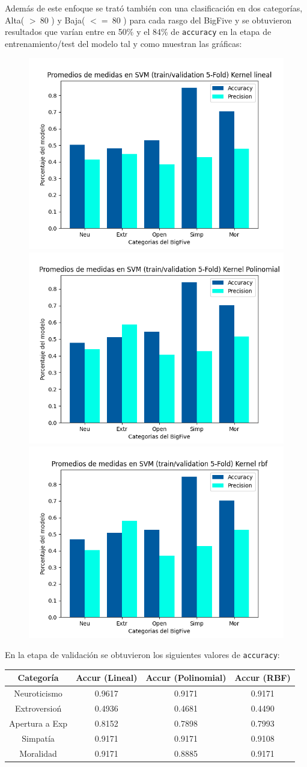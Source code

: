 \documentclass[10pt, a4paper]{article}
\begin{document}
            Adem\'as de este enfoque se trat\'o tambi\'en con una clasificaci\'on en dos categor\'ias, Alta( $>~ 80$ ) y Baja( $<= ~80$ ) para
            cada rasgo del BigFive y se obtuvieron resultados que var\'ian entre en 50\% y el 84\% de \texttt{accuracy} en la etapa 
            de entrenamiento/test del modelo tal y como muestran las gr\'aficas:\\ 

            \begin{figure}[H]
                \centering
                \includegraphics[width = 0.3\linewidth]{Medias_Lineal.png}
                \includegraphics[width = 0.3\linewidth]{Medias_Polinomial.png}
                \includegraphics[width = 0.3\linewidth]{Medias_rbf.png}

            \end{figure}

            En la etapa de validaci\'on se obtuvieron los siguientes valores de \texttt{accuracy}: \\ 

            \begin{tabular}[H]{|c|c|c|c|}

                \hline Categor\'ia & Accur (Lineal) & Accur (Polinomial) & Accur (RBF) \\  
                \hline Neuroticismo             & 0.9617 & 0.9171  &  0.9171\\
                \hline Extroversio\'n           & 0.4936 & 0.4681  &  0.4490\\
                \hline Apertura a Exp           & 0.8152 & 0.7898  &  0.7993\\
                \hline Simpat\'ia               & 0.9171 & 0.9171  &  0.9108\\
                \hline Moralidad                & 0.9171 & 0.8885  &  0.9171\\
                \hline
            \end{tabular}
\end{document}
